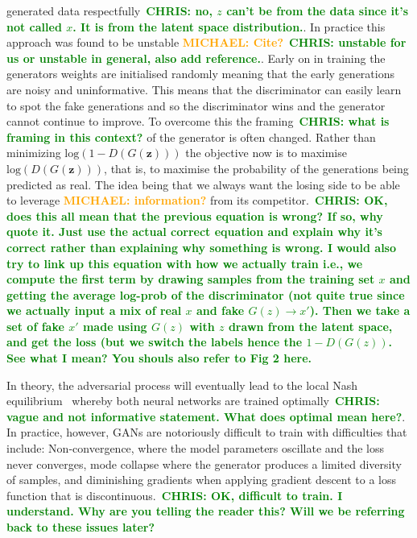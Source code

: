 \documentclass[12pt]{iopart}
\newcommand{\chris}[1]{\textbf{\textcolor{green}{CHRIS: #1}}}
\newcommand{\michael}[1]{\textbf{\textcolor{orange}{MICHAEL: #1}}}
\begin{document}
generated data respectfully~\chris{no, $z$ can't be from the data since it's
not called $x$. It is from the latent space distribution.}. In practice this
approach was found to be unstable \michael{Cite?}~\chris{unstable for us or
unstable in general, also add reference.}. Early on in training the generators
weights are initialised randomly meaning that the early generations are noisy
and uninformative. This means that the discriminator can easily learn to spot
the fake generations and so the discriminator wins and the generator cannot
continue to improve. To overcome this the framing~\chris{what is framing in
this context?} of the generator is often changed. Rather than minimizing
$\text{log}(1-D(G(\mathbf{z})))$ the objective now is to maximise
$\text{log}(D(G(\mathbf{z})))$, that is, to maximise the probability of the
generations being predicted as real. The idea being that we always want the
losing side to be able to leverage \michael{information?} from its
competitor.~\chris{OK, does this all mean that the previous equation is wrong?
If so, why quote it. Just use the actual correct equation and explain why it's
correct rather than explaining why something is wrong. I would also try to link
up this equation with how we actually train i.e., we compute the first term by
drawing samples from the training set $x$ and getting the average log-prob of
the discriminator (not quite true since we actually input a mix of real $x$ and
fake $G(z)\rightarrow x'$). Then we take a set of fake $x'$ made using $G(z)$
with $z$ drawn from the latent space, and get the loss (but we switch the
labels hence the $1-D(G(z))$. See what I mean? You shouls also refer to Fig 2
here.} 
%

%
In theory, the adversarial process will eventually lead to the local Nash
equilibrium~\cite{Nash1950} whereby both neural networks are trained
optimally~\chris{vague and not informative statement. What does optimal mean
here?}. In practice, however, \acp{GAN} are notoriously difficult to train with
difficulties that include: Non-convergence, where the model parameters
oscillate and the loss never converges, mode collapse where the generator
produces a limited diversity of samples, and diminishing gradients when
applying gradient descent to a loss function that is discontinuous.~\chris{OK,
difficult to train. I understand. Why are you telling the reader this? Will we
be referring back to these issues later?}

\end{document}

